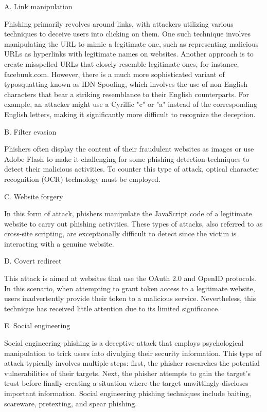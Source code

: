 \documentclass[final]{cvpr}
\begin{document}
A.  Link manipulation

Phishing primarily revolves around links, with attackers utilizing various 
techniques to deceive users into clicking on them. 
One such technique involves manipulating the URL to 
mimic a legitimate one, such as representing 
malicious URLs as hyperlinks with legitimate names on websites. 
Another approach is to create misspelled URLs that closely resemble legitimate ones,
 for instance, facebuuk.com. However, there is a much more sophisticated variant of 
typosquatting known as IDN Spoofing, which involves the use of non-English characters that bear a 
striking resemblance to their English counterparts. For example, an attacker might use a Cyrillic "c" or "a" instead of the 
corresponding English letters, making it significantly more difficult to recognize the deception.

B. Filter evasion

Phishers often display the content of their fraudulent websites as images or use Adobe Flash to make it challenging for some phishing detection techniques to detect their malicious activities.
To counter this type of attack, optical character recognition (OCR) technology must be employed.

C. Website forgery

In this form of attack, phishers manipulate the JavaScript code of a legitimate website to carry out phishing activities. 
These types of attacks, also referred to as cross-site scripting, are exceptionally difficult to detect since the victim is interacting with a genuine website.

D. Covert redirect

This attack is aimed at websites that use the OAuth 2.0 and OpenID protocols. 
In this scenario, when attempting to grant token access to a legitimate website, users inadvertently provide their token to a malicious service. 
Nevertheless, this technique has received little attention due to its limited significance.

E. Social engineering

Social engineering phishing is a deceptive attack that employs psychological manipulation to trick users into divulging their security information. 
This type of attack typically involves multiple steps: first, the phisher researches the potential vulnerabilities of their targets. 
Next, the phisher attempts to gain the target's trust before finally creating a situation where the target unwittingly discloses important information. 
Social engineering phishing techniques include baiting, scareware, pretexting, and spear phishing.
\end{document}
